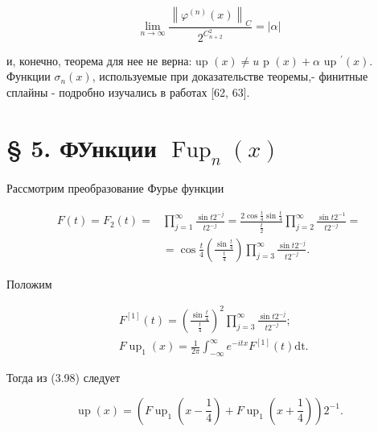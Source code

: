 \documentclass[10pt]{article}
\begin{document}
$$
\lim _{n \rightarrow \infty} \frac{\left\|\varphi^{(n)}(x)\right\|_{C}}{2^{C_{n+2}^{2}}}=|\alpha|
$$

и, конечно, теорема для нее не верна: up $(x) \neq u$ p $(x)+\alpha$ up $^{\prime}(x)$. Функции $\sigma_{n}(x)$, используемые при доказательстве теоремы,- финитные сплайны - подробно изучались в работах [62, 63].

\section*{§ 5. ФУнкции $\operatorname{Fup}_{n}(x)$}
Рассмотрим преобразование Фурье функции


\begin{align*}
F(t)=F_{2}(t)= & \prod_{j=1}^{\infty} \frac{\sin t 2^{-j}}{t 2^{-j}}=\frac{2 \cos \frac{t}{4} \sin \frac{t}{4}}{\frac{t}{2}} \prod_{j=2}^{\infty} \frac{\sin t 2^{-1}}{t 2^{-j}}= \\
& =\cos \frac{t}{4}\left(\frac{\sin \frac{t}{4}}{\frac{t}{4}}\right) \prod_{j=3}^{\infty} \frac{\sin t 2^{-j}}{t 2^{-j}} . \tag{3.98}
\end{align*}


Положим


\begin{align*}
& F^{[1]}(t)=\left(\frac{\sin \frac{t}{4}}{\frac{t}{4}}\right)^{2} \prod_{j=3}^{\infty} \frac{\sin t 2^{-j}}{t 2^{-j}} ;  \tag{3.99}\\
& F \operatorname{up}_{1}(x)=\frac{1}{2 \pi} \int_{-\infty}^{\infty} e^{-i t x} F^{[1]}(t) \mathrm{dt} .
\end{align*}


Тогда из (3.98) следует


\begin{equation*}
\operatorname{up}(x)=\left(F \operatorname{up}_{1}\left(x-\frac{1}{4}\right)+F \operatorname{up}_{1}\left(x+\frac{1}{4}\right)\right) 2^{-1} . \tag{3.100}
\end{equation*}
\end{document}
